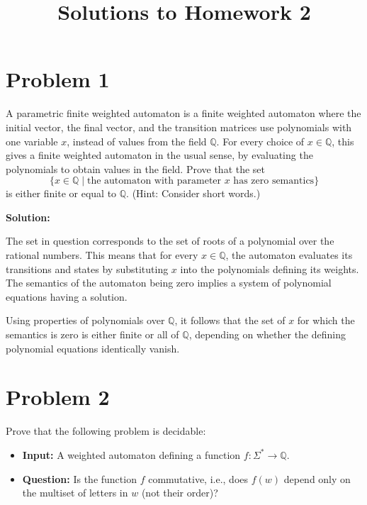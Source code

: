 \documentclass[a4paper,12pt]{article}
\title{Solutions to Homework 2}
\author{}
\date{}
\begin{document}
\maketitle

\section*{Problem 1}
A parametric finite weighted automaton is a finite weighted automaton where the initial vector, the final vector, and the transition matrices use polynomials with one variable \( x \), instead of values from the field \( \mathbb{Q} \). For every choice of \( x \in \mathbb{Q} \), this gives a finite weighted automaton in the usual sense, by evaluating the polynomials to obtain values in the field. Prove that the set
\begin{equation*}
\{x \in \mathbb{Q} \mid \text{the automaton with parameter } x \text{ has zero semantics}\}
\end{equation*}
is either finite or equal to \( \mathbb{Q} \). (Hint: Consider short words.)

\vspace{1cm}
\textbf{Solution:}

The set in question corresponds to the set of roots of a polynomial over the rational numbers. This means that for every \( x \in \mathbb{Q} \), the automaton evaluates its transitions and states by substituting \( x \) into the polynomials defining its weights. The semantics of the automaton being zero implies a system of polynomial equations having a solution.

Using properties of polynomials over \( \mathbb{Q} \), it follows that the set of \( x \) for which the semantics is zero is either finite or all of \( \mathbb{Q} \), depending on whether the defining polynomial equations identically vanish.

\vspace{2cm}

\section*{Problem 2}
Prove that the following problem is decidable:
\begin{itemize}
    \item \textbf{Input:} A weighted automaton defining a function \( f: \Sigma^* \to \mathbb{Q} \).
    \item \textbf{Question:} Is the function \( f \) commutative, i.e., does \( f(w) \) depend only on the multiset of letters in \( w \) (not their order)?
\end{itemize}
\end{document}
